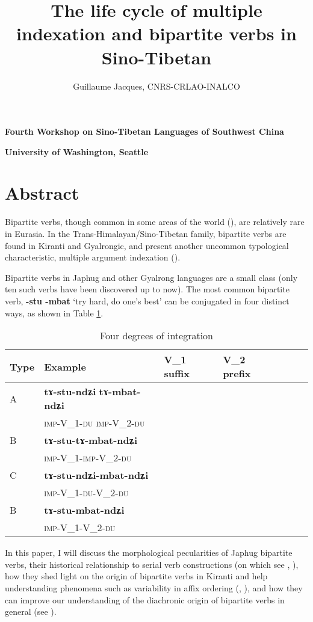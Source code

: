 \documentclass[oldfontcommands,oneside,a4paper,11pt]{article}
\newcommand{\ipa}[1]{{\phon\textbf{#1}}}
\newcommand{\Y}{\Checkmark}
\newcommand{\N}{}
\begin{document}
 
\title{The life cycle of multiple indexation and bipartite verbs in Sino-Tibetan}
\author{Guillaume Jacques, CNRS-CRLAO-INALCO}
\maketitle

\textbf{Fourth Workshop on Sino-Tibetan Languages of Southwest China}

\textbf{University of Washington, Seattle}

\section*{Abstract}
Bipartite verbs, though common in some areas of the world (\citealt{delancey96bipartite}), are relatively rare in Eurasia. In the Trans-Himalayan/Sino-Tibetan family, bipartite verbs are found in Kiranti and Gyalrongic, and present another uncommon typological characteristic, 
multiple argument indexation (\citealt{denk15multiple}).

Bipartite verbs in Japhug and other Gyalrong languages are a small class (only ten such verbs have been discovered up to now). The most common bipartite verb, \ipa{-stu -mbat} `try hard, do one's best' can be conjugated in four distinct ways, as shown in Table \ref{tab:four}.


\begin{table}[h]
\caption{Four degrees of integration} \centering \label{tab:four}
\begin{tabular}{lllllll}
\toprule
Type & Example & V_1 suffix & V_2 prefix \\
\midrule
A& \ipa{tɤ-stu-ndʑi} \ipa{tɤ-mbat-ndʑi} &\Y &\Y \\
 &\textsc{imp}-V_1-\textsc{du}  \textsc{imp}-V_2-\textsc{du} \\
B& \ipa{tɤ-stu-tɤ-mbat-ndʑi} &\N  &\Y \\
 &\textsc{imp}-V_1-\textsc{imp}-V_2-\textsc{du} \\
C& \ipa{tɤ-stu-ndʑi-mbat-ndʑi} &\Y  &\N \\
 &\textsc{imp}-V_1-\textsc{du}-V_2-\textsc{du} \\
B& \ipa{tɤ-stu-mbat-ndʑi} &\N  &\N \\
 &\textsc{imp}-V_1-V_2-\textsc{du} \\
\bottomrule
\end{tabular}
\end{table}

In this paper, I will discuss the morphological pecularities of Japhug bipartite verbs, their historical relationship to serial verb constructions (on which see \citealt{sun12complementation}, \citealt{jacques13harmonization}), how they shed light on the origin of bipartite verbs in Kiranti and help understanding phenomena such as variability in affix ordering (\citealt{bickel07chintang},  \citealt[170-172]{doornenbal09}), and how they can improve our understanding of the diachronic origin of bipartite verbs in general (see \citealt{grossmann17suffix}).




 
\end{document}
